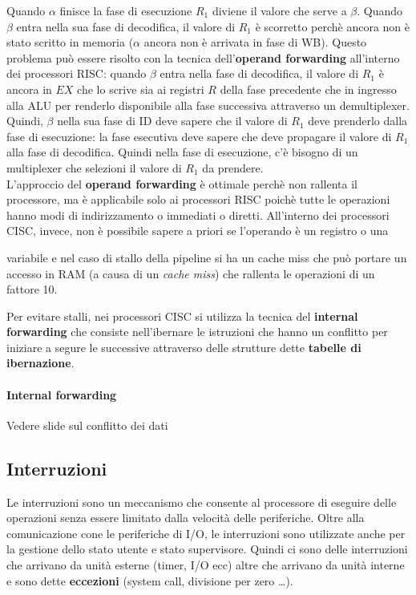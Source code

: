 \documentclass{article}
\begin{document}
Quando $\alpha$ finisce la fase di esecuzione $R_1$ diviene il valore che
serve a 
$\beta$. Quando $\beta$ entra nella sua fase di decodifica, il 
valore di $R_1$ è scorretto perchè ancora non è stato scritto in memoria 
($\alpha$ ancora non è arrivata in fase di WB). Questo problema può essere
risolto con la tecnica dell'\textbf{operand forwarding} all'interno dei
processori RISC: quando $\beta$ entra nella fase di decodifica, il valore di
$R_1$ è ancora in $EX$ che lo scrive sia ai registri $R$ della fase precedente 
che in ingresso alla ALU per renderlo disponibile alla fase  successiva 
attraverso un demultiplexer.\\
Quindi, $\beta$ nella sua fase di ID deve sapere che  il valore di $R_1$ deve
prenderlo dalla fase di esecuzione: la fase  esecutiva deve sapere che deve
propagare il valore di $R_1$ alla fase di  decodifica. Quindi nella fase di
esecuzione, c'è bisogno di  un multiplexer che selezioni il valore di $R_1$
da prendere.\\

L'approccio del \textbf{operand forwarding} è ottimale perchè non rallenta il 
processore, ma è applicabile solo ai processori RISC poichè tutte le operazioni
hanno modi di indirizzamento o immediati o diretti. All'interno dei processori 
CISC, invece, non è possibile sapere a priori se l'operando è un registro o una

variabile e nel caso di stallo della pipeline si ha un cache miss che può 
portare 
un accesso in RAM (a causa di un \textit{cache miss})
che rallenta le operazioni di un fattore 10.

Per evitare stalli, nei processori CISC si utilizza la tecnica del
\textbf{internal forwarding}
che consiste nell'ibernare le istruzioni che hanno un conflitto per 
iniziare a segure le successive attraverso delle strutture dette 
\textbf{tabelle di ibernazione}.

\paragraph{Internal forwarding}
Vedere slide sul conflitto dei dati

\subsection{Interruzioni}
Le interruzioni sono un meccanismo che consente al processore di eseguire delle
operazioni senza essere limitato dalla velocità delle periferiche. 
Oltre alla comunicazione cone le periferiche di I/O, le interruzioni sono
utilizzate anche per la gestione dello stato utente e stato supervisore.
Quindi ci sono delle interruzioni che arrivano da unità esterne  
(timer, I/O ecc) altre che arrivano da unità interne e sono dette 
\textbf{eccezioni} (system call, divisione per zero \dots).\\
\end{document}
